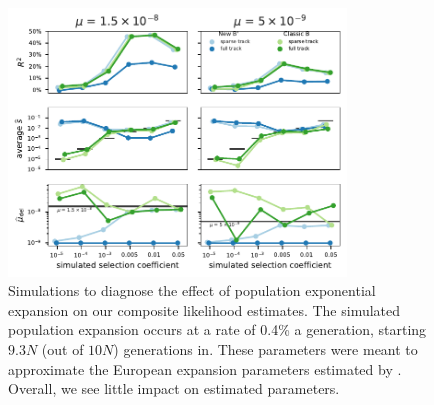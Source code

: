 \documentclass[11pt]{article}
\begin{document}
\begin{figure}[htbp]
  \centering
  \includegraphics[width=0.8\textwidth]{figures/supplementary/subfigure_sim_mle_expansion.pdf}

  \caption{Simulations to diagnose the effect of population exponential
      expansion on our composite likelihood estimates. The simulated population
      expansion occurs at a rate of 0.4\% a generation, starting $9.3N$ (out of
      $10N$) generations in. These parameters were meant to approximate the
  European expansion parameters estimated by \textcite{Gutenkunst2009-pg}.
Overall, we see little impact on estimated parameters.}

    \label{suppfig:sim-exp}
\end{figure}
\end{document}
